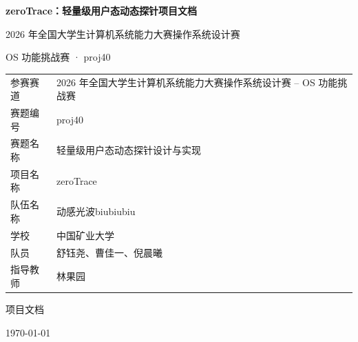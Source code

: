 \documentclass[UTF8,a4paper,11pt,fontset=fandol]{ctexart}
\renewcommand{\arraystretch}{1.22}
\newcommand{\code}[1]{\texttt{#1}}
\begin{document}
\hypersetup{pageanchor=false}

\begin{titlepage}
  \centering
  \vspace*{2.0cm}
  {\bfseries zeroTrace：轻量级用户态动态探针项目文档\par}
  \vspace{0.8cm}
  {2026 年全国大学生计算机系统能力大赛操作系统设计赛\par}
  \vspace{0.2cm}
  {OS 功能挑战赛 · proj40\par}
  \vspace{1.8cm}

  \renewcommand{\arraystretch}{1.35}
  \begin{tabular}{P{3.5cm}P{9.2cm}}
    \toprule
    参赛赛道 & 2026 年全国大学生计算机系统能力大赛操作系统设计赛 -- OS 功能挑战赛 \\
    赛题编号 & proj40 \\
    赛题名称 & 轻量级用户态动态探针设计与实现 \\
    项目名称 & zeroTrace \\
    队伍名称 & 动感光波biubiubiu \\
    学校 & 中国矿业大学 \\
    队员 & 舒钰尧、曹佳一、倪晨曦 \\
    指导教师 & 林果园 \\
    \bottomrule
  \end{tabular}

  \vfill
  {\large 项目文档\par}
  \vspace{0.2cm}
  {\large \today\par}
\end{titlepage}

\hypersetup{pageanchor=true}
\tableofcontents
\newpage

\begin{abstract}
zeroTrace 是一套面向 Linux 用户态程序的轻量级动态探针系统。传统 uprobe 在命中用户态函数时通常要切到内核侧处理事件，高频函数上的上下文切换会明显放大观测成本。zeroTrace 把安装阶段和命中阶段分开：tracer 进程负责安装、更新和清理 probe；函数命中后的快速路径留在目标进程用户态内部，由入口 patch、trampoline、payload stub 和共享 trace buffer 完成参数采集、返回值捕获和事件输出。

系统支持动态库函数追踪、前 6 个参数捕获、return probe、多 probe 共存、动态开关、线程组级 patch 安全、条件过滤、探针热更新和探针内调用目标进程函数，并提供 x86\_64 与 aarch64 两套 ISA 后端。日志沿用 perf/ftrace 风格字段，记录 comm、pid/tid、CPU、\code{CLOCK\_MONOTONIC} 时间戳和事件类型，便于和系统级 trace 事件放到同一条时间线上分析。本次 x86\_64 评测中，zeroTrace 单次 probe 额外开销均值为 174.45 ns，比 kernel uprobe 低 11.08 倍；在 Google Cloud T2A aarch64 环境中，zeroTrace 额外开销均值为 237.02 ns，比 kernel uprobe 低 2.02 倍。两套环境中的 probe 安装/卸载延迟均低于赛题指标要求。

\noindent\textbf{关键词：}用户态动态探针；ptrace；trampoline；return probe；trace buffer；多线程安全；热更新
\end{abstract}
\end{document}
